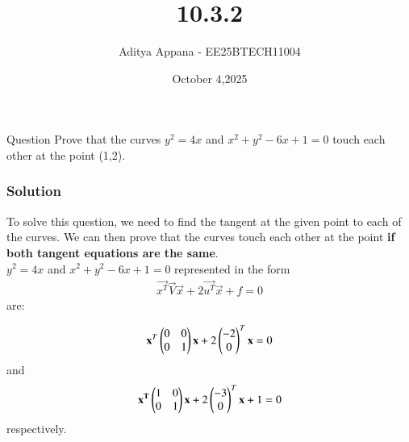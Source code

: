 \documentclass{beamer}
\title %
{10.3.2}
\date{October 4,2025}
\author %
{Aditya Appana - EE25BTECH11004}
\begin{document}
\frame{\titlepage}
\begin{frame}{Question}
Prove that the curves $y^2 = 4x$ and $x^2 + y^2-6x + 1 = 0$ touch each other at the point (1,2).
\end{frame}



\begin{frame}[fragile]
    \frametitle{Solution}
To solve this question, we need to find the tangent at the given point to each of the curves. We can then prove that the curves touch each other at the point \textbf{if both tangent equations are the same}.\\
$y^2 = 4x$ and $x^2 + y^2-6x + 1 = 0$ represented in the form \setcounter{equation}{-1} \begin{align}\vec{x^T}\vec{V}\vec{x} + 2\vec{u^T}\vec{x}+f = 0\end{align} are:

\begin{align}
    \mathbf{x}^T\begin{pmatrix}0&0\\0&1\end{pmatrix}\mathbf{x} + 2\begin{pmatrix}-2\\0\end{pmatrix}^T\mathbf{x} = 0
\end{align}
and
\begin{align}
    \mathbf{x^T}\begin{pmatrix}1&0\\0&1\end{pmatrix}\mathbf{x} + 2\begin{pmatrix}-3\\0\end{pmatrix}^T\mathbf{x} + 1 = 0
\end{align}
respectively.
\end{frame}
\end{document}
